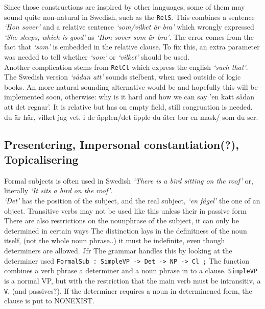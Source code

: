 \documentclass{report}
\begin{document}
Since those constructions are inspired by other languages, some of them may sound quite
non-natural in Swedish, such as the \verb|RelS|. This combines a sentence \emph{`Hon sover'}
and a relative sentence \emph{`som/vilket är bra'} which wrongly expressed 
\emph{`She sleeps, which is good'} as
\emph{`Hon sover som är bra'}. The error comes from the fact that \emph{`som'} is
embedded in the relative clause. To fix this, an extra parameter was needed to tell whether
\emph{`som'} or \emph{`vilket'} should be used. \\
Another complication stems from \verb|RelCl| which express the english \emph{`such that'}.
The Swedish version \emph{`sådan att'} sounds stelbent, when used outside of logic books.
An more natural sounding alternative would be
and hopefully this will be implemented soon, otherwise: why is it hard and how we can say
'en katt sådan att det regnar'. It is relative but has on empty field, still congruation is
needed.
du är här, vilket jag vet.
i de äpplen/det äpple du äter bor en mask/ som du ser.\\

\subsection{Presentering, Impersonal constantiation(?), Topicalisering}
Formal subjects \cite{SAG-19,H&H-309d} is often used in Swedish
\emph{`There is a bird sitting on the roof'}
or, literally
\emph{`It sits a bird on the roof'}.\\
\emph{`Det'} has the position of the subject, and the real subject, 
\emph{`en fågel'} the one of an object.
Transitive verbs may not be used like this
unless their in passive form
There are also restrictions on the nounphrase of the subject, it can only
be determined in certain ways
The distinction lays in the definitness of the noun itself, (not the whole noun phrase..)
it must be indefinite, even though determiners are allowed. Jfr
The grammar handles this by looking at the determiner used
\verb|FormalSub : SimpleVP -> Det -> NP -> Cl ;|
The function combines a verb phrase a determiner and a noun phrase in to a clause.
\verb|SimpleVP| is a normal VP, but with the restriction that the main verb must be
intransitiv, a \verb|V|, (and passives?). If the  determiner requires a noun in determinened
form, the clause is put to NONEXIST.
\end{document}
